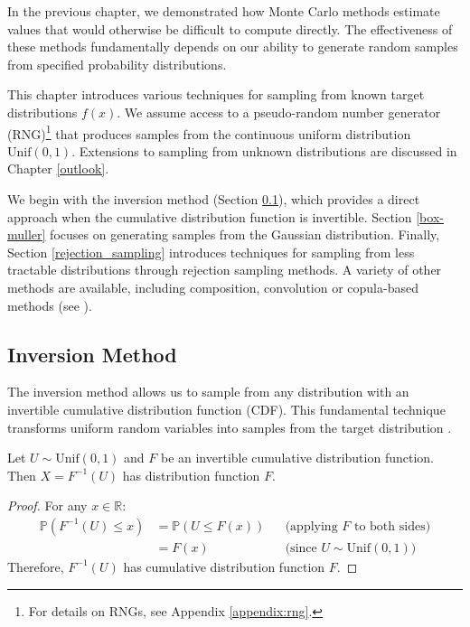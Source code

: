 In the previous chapter, we demonstrated how Monte Carlo methods estimate values that would otherwise be difficult to compute directly. The effectiveness of these methods fundamentally depends on our ability to generate random samples from specified probability distributions.

This chapter introduces various techniques for sampling from known target distributions $f(x)$. We assume access to a pseudo-random number generator (RNG)\footnote{For details on RNGs, see Appendix \ref{appendix:rng}.} that produces samples from the continuous uniform distribution $\text{Unif}(0,1)$. Extensions to sampling from unknown distributions are discussed in Chapter \ref{outlook}.

We begin with the inversion method (Section \ref{Inversion Method}), which provides a direct approach when the cumulative distribution function is invertible. Section \ref{box-muller} focuses on generating samples from the Gaussian distribution. Finally, Section \ref{rejection_sampling} introduces techniques for sampling from less tractable distributions through 
rejection sampling methods. 
A variety of other methods are available, including composition, convolution or copula-based methods (see \cite{lemieux_monte_2009}).

\subsection{Inversion Method}
\label{Inversion Method}

The inversion method allows us to sample from any distribution with an invertible cumulative distribution function (CDF). This fundamental technique transforms uniform random variables into samples from the target distribution \citep{murphy_probabilistic_2023, lemieux_monte_2009}.

\begin{theoremrep}
\label{thm:inverse-transform}
Let $U \sim \text{Unif}(0,1)$ and $F$ be an invertible cumulative distribution function. Then $X = F^{-1}(U)$ has distribution function $F$.
\end{theoremrep}

\begin{proof}
For any $x \in \mathbb{R}$:
\begin{align*}
\mathbb{P}(F^{-1}(U) \leq x) 
&= \mathbb{P}(U \leq F(x)) && \text{(applying $F$ to both sides)} \\
&= F(x) && \text{(since $U \sim \text{Unif}(0,1)$)}
\end{align*}
Therefore, $F^{-1}(U)$ has cumulative distribution function $F$. 
\end{proof}

